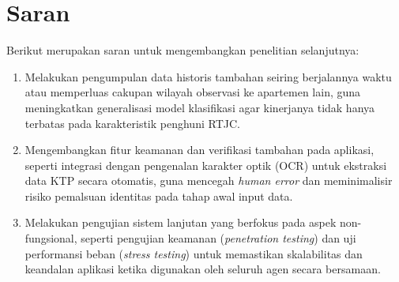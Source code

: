 \section{Saran}
\label{sec:saran}
Berikut merupakan saran untuk mengembangkan penelitian selanjutnya:

\begin{enumerate}
    \item Melakukan pengumpulan data historis tambahan seiring berjalannya waktu atau memperluas cakupan wilayah observasi ke apartemen lain, guna meningkatkan generalisasi model klasifikasi agar kinerjanya tidak hanya terbatas pada karakteristik penghuni RTJC.
    
    \item Mengembangkan fitur keamanan dan verifikasi tambahan pada aplikasi, seperti integrasi dengan pengenalan karakter optik (OCR) untuk ekstraksi data KTP secara otomatis, guna mencegah \textit{human error} dan meminimalisir risiko pemalsuan identitas pada tahap awal input data.
    
    \item Melakukan pengujian sistem lanjutan yang berfokus pada aspek non-fungsional, seperti pengujian keamanan (\textit{penetration testing}) dan uji performansi beban (\textit{stress testing}) untuk memastikan skalabilitas dan keandalan aplikasi ketika digunakan oleh seluruh agen secara bersamaan.
\end{enumerate}